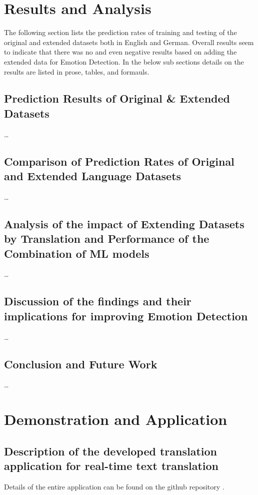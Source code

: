\documentclass[11pt]{article}
\begin{document}
\clearpage
\section{Results and Analysis}
\label{sec:results-and-analysis}
The following section lists the prediction rates of training and testing of the original and extended datasets both in English and German. Overall results seem to indicate that there was no and even negative results based on adding the extended data for Emotion Detection. In the below sub sections details on the results are listed in prose, tables, and formauls.

\subsection{Prediction Results of Original \& Extended Datasets}

\ldots

\subsection{Comparison of Prediction Rates of Original and Extended Language Datasets}
\ldots

\subsection{Analysis of the impact of Extending Datasets by Translation and Performance of the Combination of ML models}
\ldots

\subsection{Discussion of the findings and their implications for improving Emotion Detection}
\ldots

\subsection{Conclusion and Future Work}
\ldots

\clearpage
\section{Demonstration and Application}

\subsection{Description of the developed translation application for real-time text translation}
Details of the entire application can be found on the github repository \cite{Hoehn_Improving_Emotion_Detection_2023}.
\end{document}
